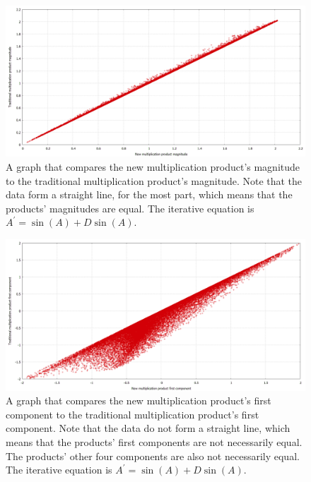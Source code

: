 \documentclass[12pt]{article}
\begin{document}
\begin{figure} 
\centering
  \includegraphics[width = 6 in]{sinz_c_magnitude.png}
  \caption{A graph that compares the new multiplication product's magnitude to the traditional multiplication product's magnitude.
Note that the data form a straight line, for the most part, which means that the products' magnitudes are equal.
The iterative equation is $A^{\prime} = \sin(A) + D \sin(A)$.
}
\end{figure}


\begin{figure} 
\centering
  \includegraphics[width = 6 in]{sinz_c_first_component.png}
  \caption{A graph that compares the new multiplication product's first component to the traditional multiplication product's first component.
Note that the data do not form a straight line, which means that the products' first components are not necessarily equal.
The products' other four components are also not necessarily equal.
The iterative equation is $A^{\prime} = \sin(A) + D \sin(A)$.
}
\end{figure}
\end{document}
